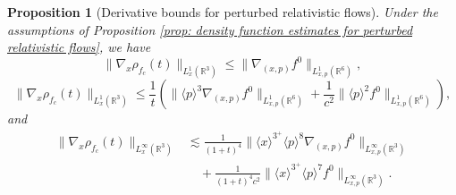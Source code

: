 \documentclass[reqno, 11pt, letterpaper]{amsart}
\newtheorem{proposition}[theorem]{Proposition}
\theoremstyle{remark}
\numberwithin{equation}{section}
\numberwithin{theorem}{section}
\numberwithin{table}{section}
\numberwithin{figure}{section}
\begin{document}
\begin{proposition}[Derivative bounds for perturbed relativistic flows]
\label{prop: derivative bounds for perturbed relativistic flows}  Under the assumptions of Proposition \ref{prop: density function estimates for perturbed relativistic flows}, we have
\begin{equation}
\label{eq: derivative bound without extra decay}
\|\nabla_x\rho_{f_c}(t)\|_{L_x^1(\mathbb{R}^3)} \leq \|\nabla_{(x,p)}f^0\|_{L_{x,p}^1(\mathbb{R}^6)},
\end{equation}
\begin{equation}
\label{eq: derivative bound with extra decay}
\|\nabla_x\rho_{f_c}(t)\|_{L_x^1(\mathbb{R}^3)} \leq
\frac{1}{t}\left (\| \langle p \rangle^3 \nabla_{(x,p)} f^0 \|_{L^1_{x,p}(\mathbb{R}^6)} + \frac{1}{c^2} \| \langle p \rangle^2 f^0 \|_{L^1_{x,p}(\mathbb{R}^6)} \right ),
\end{equation}
and
\begin{equation}\label{eq: L infinity derivative bound}
\begin{aligned}
\|\nabla_x\rho_{f_c}(t)\|_{L_x^\infty(\mathbb{R}^3)}&\lesssim\frac{1}{(1+t)^4}\Big\|\langle x\rangle^{3^+}\langle p\rangle^{8}\nabla_{(x,p)}f^0\Big\|_{L_{x,p}^\infty(\mathbb{R}^3)}\\
&\quad+\frac{1}{(1+t)^4c^2} \Big\|\langle x\rangle^{3^+}\langle p\rangle^{7} f^0\Big\|_{L_{x,p}^\infty(\mathbb{R}^3)}.
\end{aligned}\end{equation}
\end{proposition}
\end{document}
